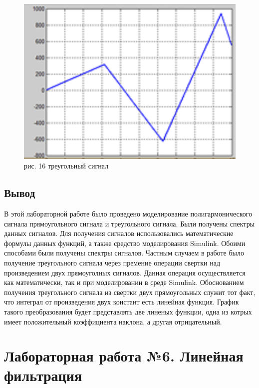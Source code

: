 \documentclass[10pt,a4paper]{report}
\begin{document}
\begin{figure}
\begin{center}
\includegraphics[angle=0, scale = 0.9]{16.png}\newline
рис. 16    треугольный сигнал\newline
\end{center}
\end{figure}


\clearpage
\section{Вывод}
В этой лабораторной работе было проведено моделирование полигармонического сигнала
 прямоугольного сигнала и треугольного сигнала. Были получены спектры данных сигналов. Для получения сигналов использовались математические формулы данных функций, а также средство моделирования Simulink. Обоими способами были получены спектры сигналов. Частным случаем в работе было получение треугольного сигнала через премение операции свертки над произведением двух прямоуголных сигналов. Данная операция осуществляется как математически, так и при моделировании в среде Simulink.
Обоснованием получения треугольного сигнала из свертки двух прямоугольных служит тот факт, что интеграл от произведения двух констант есть линейная функция. График такого преобразования будет представлять две линеных функции, одна из котрых имеет положительный коэффициента наклона, а другая отрицательный.
\chapter{Лабораторная работа №6. Линейная фильтрация}
\end{document}
